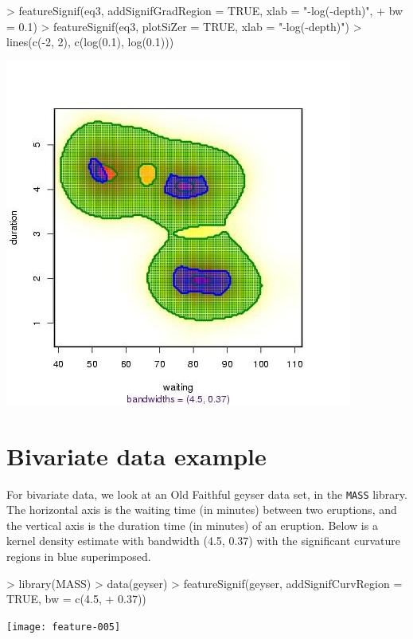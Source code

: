 \documentclass[a4paper,11pt]{article}
\begin{document}
\begin{Schunk}
\begin{Sinput}
> featureSignif(eq3, addSignifGradRegion = TRUE, xlab = "-log(-depth)", 
+     bw = 0.1)
> featureSignif(eq3, plotSiZer = TRUE, xlab = "-log(-depth)")
> lines(c(-2, 2), c(log(0.1), log(0.1)))
\end{Sinput}
\end{Schunk}
\begin{center}
\includegraphics{feature-003}
\end{center}

\section{Bivariate data example}

For bivariate data, we look at an Old Faithful geyser data set,
in the \texttt{MASS} library. The
horizontal axis is the waiting time (in minutes) between two eruptions, and
the vertical axis is the duration time (in minutes) of an eruption.
Below is a kernel density estimate with
bandwidth (4.5, 0.37) with %
the significant curvature regions in blue superimposed.
\begin{center}
\begin{Schunk}
\begin{Sinput}
> library(MASS)
> data(geyser)
> featureSignif(geyser, addSignifCurvRegion = TRUE, bw = c(4.5, 
+     0.37))
\end{Sinput}
\end{Schunk}
\texttt{[image: feature-005]}
\end{center}
\end{document}
